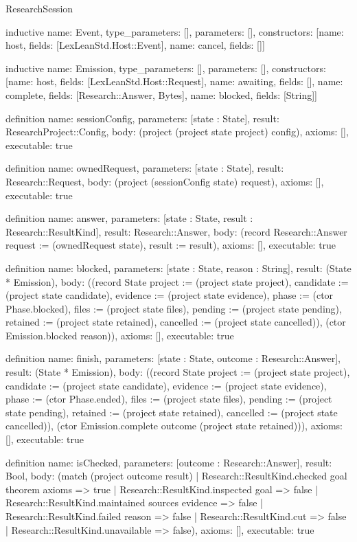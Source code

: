 \begin{lexlean}{ResearchSession}
\begin{semanticmodule}
inductive{
 name: Event,
 type_parameters: [],
 parameters: [],
 constructors: [{name: host, fields: [LexLeanStd.Host::Event]}, {name: cancel, fields: []}]
}

inductive{
 name: Emission,
 type_parameters: [],
 parameters: [],
 constructors: [{name: host, fields: [LexLeanStd.Host::Request]}, {name: awaiting, fields: []}, {name: complete, fields: [Research::Answer, Bytes]}, {name: blocked, fields: [String]}]
}

definition{
 name: sessionConfig,
 parameters: [state : State],
 result: ResearchProject::Config,
 body: (project (project state project) config),
 axioms: [],
 executable: true
}

definition{
 name: ownedRequest,
 parameters: [state : State],
 result: Research::Request,
 body: (project (sessionConfig state) request),
 axioms: [],
 executable: true
}

definition{
 name: answer,
 parameters: [state : State, result : Research::ResultKind],
 result: Research::Answer,
 body: (record Research::Answer {request := (ownedRequest state), result := result}),
 axioms: [],
 executable: true
}

definition{
 name: blocked,
 parameters: [state : State, reason : String],
 result: (State * Emission),
 body: ((record State {project := (project state project), candidate := (project state candidate), evidence := (project state evidence), phase := (ctor Phase.blocked), files := (project state files), pending := (project state pending), retained := (project state retained), cancelled := (project state cancelled)}), (ctor Emission.blocked reason)),
 axioms: [],
 executable: true
}

definition{
 name: finish,
 parameters: [state : State, outcome : Research::Answer],
 result: (State * Emission),
 body: ((record State {project := (project state project), candidate := (project state candidate), evidence := (project state evidence), phase := (ctor Phase.ended), files := (project state files), pending := (project state pending), retained := (project state retained), cancelled := (project state cancelled)}), (ctor Emission.complete outcome (project state retained))),
 axioms: [],
 executable: true
}

definition{
 name: isChecked,
 parameters: [outcome : Research::Answer],
 result: Bool,
 body: (match (project outcome result) | Research::ResultKind.checked goal theorem axioms => true | Research::ResultKind.inspected goal => false | Research::ResultKind.maintained sources evidence => false | Research::ResultKind.failed reason => false | Research::ResultKind.cut => false | Research::ResultKind.unavailable => false),
 axioms: [],
 executable: true
}


\end{semanticmodule}
\end{lexlean}
